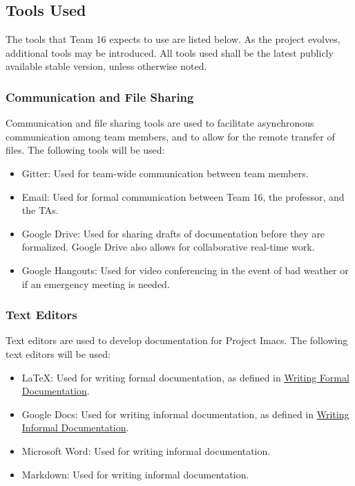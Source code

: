 \documentclass{article}
\begin{document}
\subsection{Tools Used}
The tools that Team 16 expects to use are listed below. As the project evolves, additional tools may be introduced. All tools used shall be the latest publicly available stable version, unless otherwise noted.

\subsubsection{Communication and File Sharing}
Communication and file sharing tools are used to facilitate asynchronous communication among team members, and to allow for the remote transfer of files. The following tools will be used:

\begin{itemize}
\item Gitter: Used for team-wide communication between team members.
\item Email: Used for formal communication between Team 16, the professor, and the TAs.
\item Google Drive: Used for sharing drafts of documentation before they are formalized. Google Drive also allows for collaborative real-time work.
\item Google Hangouts: Used for video conferencing in the event of bad weather or if an emergency meeting is needed.
\end{itemize}

\subsubsection{Text Editors}
Text editors are used to develop documentation for Project Imacs. The following text editors will be used:

\begin{itemize}
\item LaTeX: Used for writing formal documentation, as defined in \hyperref[sec:formal-documentation]{Writing Formal Documentation}.
\item Google Docs: Used for writing informal documentation, as defined in \hyperref[sec:informal-documentation]{Writing Informal Documentation}.
\item Microsoft Word: Used for writing informal documentation.
\item Markdown: Used for writing informal documentation.
\end{itemize}
\end{document}
